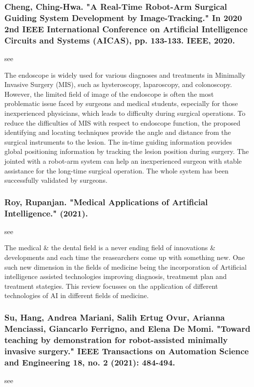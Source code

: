 \documentclass[conference]{IEEEtran}
\begin{document}
\medskip
\subsubsection{Cheng, Ching-Hwa. "A Real-Time Robot-Arm Surgical Guiding System Development by Image-Tracking." In 2020 2nd IEEE International Conference on Artificial Intelligence Circuits and Systems (AICAS), pp. 133-133. IEEE, 2020.}
see \cite{cheng2020real}

The endoscope is widely used for various diagnoses and treatments in Minimally Invasive Surgery (MIS), such as hysteroscopy, laparoscopy, and colonoscopy. However, the limited field of image of the endoscope is often the most problematic issue faced by surgeons and medical students, especially for those inexperienced physicians, which leads to difficulty during surgical operations. To reduce the difficulties of MIS with respect to endoscope function, the proposed identifying and locating techniques provide the angle and distance from the surgical instruments to the lesion. The in-time guiding information provides global positioning information by tracking the lesion position during surgery. The jointed with a robot-arm system can help an inexperienced surgeon with stable assistance for the long-time surgical operation. The whole system has been successfully validated by surgeons.

\medskip
\subsubsection{Roy, Rupanjan. "Medical Applications of Artificial Intelligence." (2021).}
see \cite{roy2021medical}

The medical \& the dental field is a never ending field of innovations \& developments and each time the reasearchers come up with something new. One such new dimension in the fields of medicine being the incorporation of Artificial intelligence assisted technologies improving diagnosis, treatmemt plan and treatment stategies. This review focusses on the application of different technologies of AI in different fields of medicine.

\medskip
\subsubsection{Su, Hang, Andrea Mariani, Salih Ertug Ovur, Arianna Menciassi, Giancarlo Ferrigno, and Elena De Momi. "Toward teaching by demonstration for robot-assisted minimally invasive surgery." IEEE Transactions on Automation Science and Engineering 18, no. 2 (2021): 484-494.}
see \cite{su2021toward}
\end{document}

